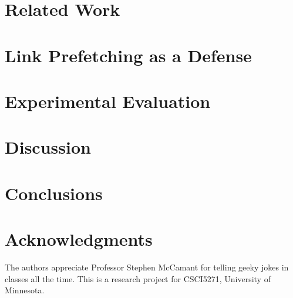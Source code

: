 \documentclass{sig-alternate-05-2015}
\begin{document}
\section{Related Work}


\section{Link Prefetching as a Defense}


\section{Experimental Evaluation}


\section{Discussion}


\section{Conclusions}



\section{Acknowledgments}
The authors appreciate Professor Stephen McCamant for telling geeky jokes in classes all the time.
This is a research project for CSCI5271, University of Minnesota.



\end{document}
